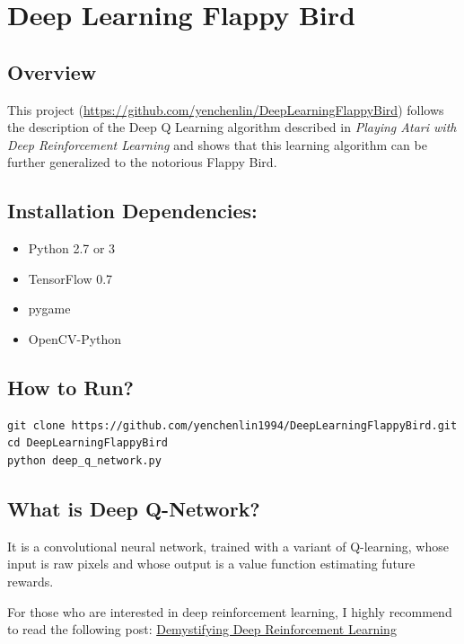 \documentclass[a4paper, 11pt]{article}
\begin{document}
\section{Deep Learning Flappy Bird }
\subsection*{Overview}
This project (\url{https://github.com/yenchenlin/DeepLearningFlappyBird}) follows the description of the Deep Q Learning algorithm described in \emph{Playing Atari with Deep Reinforcement Learning} and shows that this learning algorithm can be further generalized to the notorious Flappy Bird.

\subsection*{Installation Dependencies:}

\begin{itemize}
\itemsep1pt\parskip0pt
\item
  Python 2.7 or 3
\item
  TensorFlow 0.7
\item
  pygame
\item
  OpenCV-Python
\end{itemize}

\href{https://github.com/yenchenlin/DeepLearningFlappyBird\#how-to-run}{}

\subsection*{How to Run?}

\begin{verbatim}
git clone https://github.com/yenchenlin1994/DeepLearningFlappyBird.git
cd DeepLearningFlappyBird
python deep_q_network.py
\end{verbatim}

\href{https://github.com/yenchenlin/DeepLearningFlappyBird\#what-is-deep-q-network}{}

\subsection*{What is Deep Q-Network?}

It is a convolutional neural network, trained with a variant of
Q-learning, whose input is raw pixels and whose output is a value
function estimating future rewards.

For those who are interested in deep reinforcement learning, I highly
recommend to read the following post: \href{http://www.nervanasys.com/demystifying-deep-reinforcement-learning/}{Demystifying Deep Reinforcement Learning}
\end{document}
